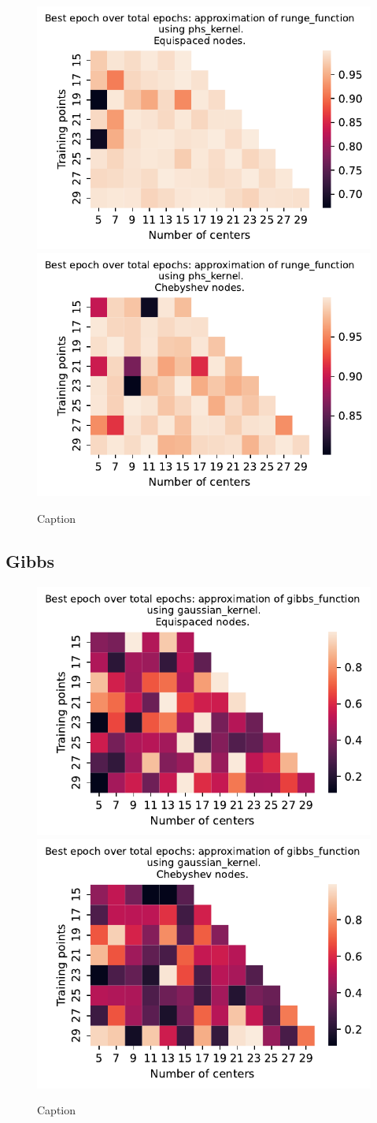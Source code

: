 \documentclass[12pt]{report} %
\begin{document}
\begin{figure}[ht]
    \centering
    
    \includegraphics[width=.49\textwidth]{imagenes/experiments/1d/variational_epochs/runge_function-Kphs_kernel-Equi-epochs.pdf}
    \includegraphics[width=.49\textwidth]{imagenes/experiments/1d/variational_epochs/runge_function-Kphs_kernel-Cheb-epochs.pdf}
    \caption{Caption}
    \label{fig:epochs-runge-phs}
\end{figure}


\subsection*{Gibbs}

\begin{figure}[ht]
    \centering
    
    \includegraphics[width=.49\textwidth]{imagenes/experiments/1d/variational_epochs/gibbs_function-Kgaussian_kernel-Equi-epochs.pdf}
    \includegraphics[width=.49\textwidth]{imagenes/experiments/1d/variational_epochs/gibbs_function-Kgaussian_kernel-Cheb-epochs.pdf}
    \caption{Caption}
    \label{fig:epochs-gibbs-gaussian}
\end{figure}
\end{document}
